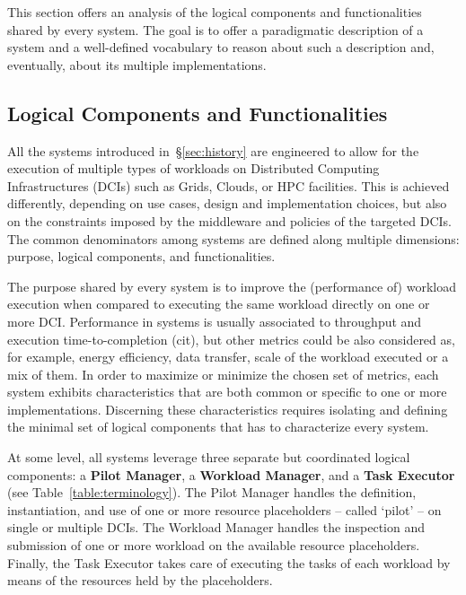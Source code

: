 \documentclass{sig-alternate}
\begin{document}
This section offers an analysis of the logical components and functionalities
shared by every \pilot system. The goal is to offer a paradigmatic description
of a \pilot system and a well-defined vocabulary to reason about such a
description and, eventually, about its multiple implementations.

\subsection{Logical Components and Functionalities}
\label{subsec:3.1}

All the \pilot systems introduced in~\S\ref{sec:history} are engineered
to allow for the execution of multiple types of workloads on Distributed
Computing Infrastructures (DCIs) such as Grids, Clouds, or HPC
facilities. This is achieved differently, depending on use cases, design
and implementation choices, but also on the constraints imposed by the
middleware and policies of the targeted DCIs. The common denominators
among \pilot systems are defined along multiple dimensions: purpose,
logical components, and functionalities.

The purpose shared by every \pilot system is to improve the (performance of)
workload execution when compared to executing the same workload directly on one
or more DCI. Performance in \pilot systems is usually associated to throughput
and execution time-to-completion (cit), but other metrics could be also
considered as, for example, energy efficiency, data transfer, scale of the
workload executed or a mix of them. In order to maximize or minimize the chosen
set of metrics, each \pilot system exhibits characteristics that are both
common or specific to one or more implementations. Discerning these
characteristics requires isolating and defining the minimal set of logical
components that has to characterize every \pilot system.

At some level, all \pilot systems leverage three separate but
coordinated logical components: a \textbf{Pilot Manager}, a
\textbf{Workload Manager}, and a \textbf{Task Executor} (see
Table~\ref{table:terminology}). The Pilot Manager handles the
definition, instantiation, and use of one or more resource placeholders
-- called `pilot' -- on single or multiple DCIs. The Workload Manager
handles the inspection and submission of one or more workload on the
available resource placeholders. Finally, the Task Executor takes
care of executing the tasks of each workload by means of the
resources held by the placeholders.
\end{document}
